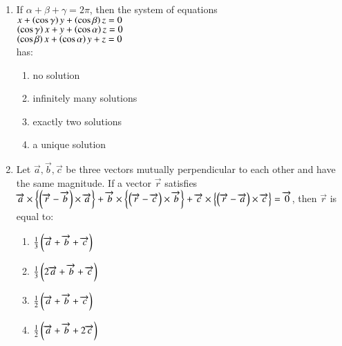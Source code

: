 \documentclass[journal]{IEEEtran}
\begin{document}
\begin{enumerate}
\setcounter{enumi}{0}
 
    \item If $\alpha+\beta+\gamma=2\pi$, then the system of equations\\
    $x+\left(\cos\gamma\right)y+\left(\cos\beta\right)z=0$\\
    $\left(\cos\gamma\right)x+y+\left(\cos\alpha\right)z=0$\\
    $\left(\cos\beta\right)x+\left(\cos\alpha\right)y+z=0$\\
    has:

        \begin{multicols}{2}
            \begin{enumerate}
                \item no solution
                \item infinitely many solutions
                \item exactly two solutions
                \item a unique solution
            \end{enumerate}
        \end{multicols}

    \item Let $\overrightarrow{a},\overrightarrow{b},\overrightarrow{c}$ be three vectors mutually perpendicular to each other and have the same magnitude. If a vector $\overrightarrow{r}$ satisfies 
    $\overrightarrow{a}\times\left\{ \left(\overrightarrow{r}-\overrightarrow{b}\right)\times\overrightarrow{a} \right\} + \overrightarrow{b}\times\left\{ \left(\overrightarrow{r}-\overrightarrow{c}\right)\times\overrightarrow{b} \right\} + \overrightarrow{c}\times\left\{ \left(\overrightarrow{r}-\overrightarrow{a}\right)\times\overrightarrow{c} \right\} = \overrightarrow{0}$, then $\overrightarrow{r}$ is equal to:

		\begin{multicols}{4}
			\begin{enumerate}
				\item $\frac{1}{3}\left(\overrightarrow{a}+\overrightarrow{b}+\overrightarrow{c}\right)$
				\item $\frac{1}{3}\left(2\overrightarrow{a}+\overrightarrow{b}+\overrightarrow{c}\right)$
				\item $\frac{1}{2}\left(\overrightarrow{a}+\overrightarrow{b}+\overrightarrow{c}\right)$
				\item $\frac{1}{2}\left(\overrightarrow{a}+\overrightarrow{b}+2\overrightarrow{c}\right)$
			\end{enumerate}
		\end{multicols}


\end{enumerate}
\end{document}
